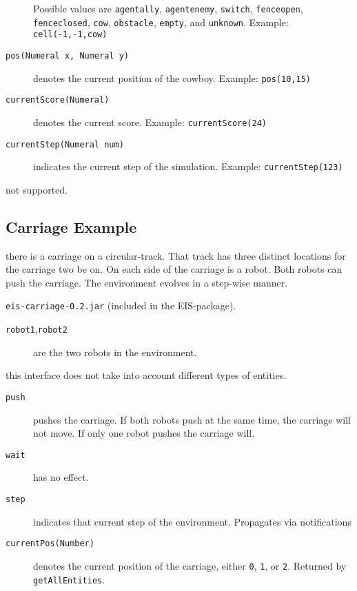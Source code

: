 \documentclass[a4]{article}
\newcommand{\EIS}{\textsf{EIS}\xspace}
\begin{document}
\begin{description}
Possible values are \texttt{agentally}, \texttt{agentenemy}, \texttt{switch}, \texttt{fenceopen}, 
\texttt{fenceclosed}, \texttt{cow}, \texttt{obstacle}, \texttt{empty}, and \texttt{unknown}. 
Example: \texttt{cell(-1,-1,cow)}
\item[\texttt{pos(Numeral x, Numeral y)}] denotes the current position of the cowboy. Example: \texttt{pos(10,15)}
\item[\texttt{currentScore(Numeral)}] denotes the current score. Example: \texttt{currentScore(24)}
\item[\texttt{currentStep(Numeral num)}] indicates the current step of the simulation.
Example: \texttt{currentStep(123)}
\end{description}

 not supported.
\subsection{Carriage Example}

\medskip{} there is a carriage on a circular-track. That track has three 
distinct locations for the carriage two be on. On each side of the carriage is a robot. Both robots can push the carriage.
The environment evolves in a step-wise manner.

\medskip{} \texttt{eis-carriage-0.2.jar} (included in the \EIS-package).

\medskip{}
\begin{description}
\item[\texttt{robot1},\texttt{robot2}] are the two robots in the environment.
\end{description}

 this interface does not take into account different types of entities.

\medskip{}
\begin{description}
\item[\texttt{push}] pushes the carriage. If both robots push at the same time, the carriage will not move. If only
one robot pushes the carriage will.
\item[\texttt{wait}] has no effect.
\end{description}

\begin{description}
\item[\texttt{step}] indicates that current step of the environment. Propagates via notifications 
\item[\texttt{currentPos(Number)}] denotes the current position of the carriage, either \texttt{0}, \texttt{1}, or \texttt{2}.
Returned by \texttt{getAllEntities}.
\end{description}
\end{document}
